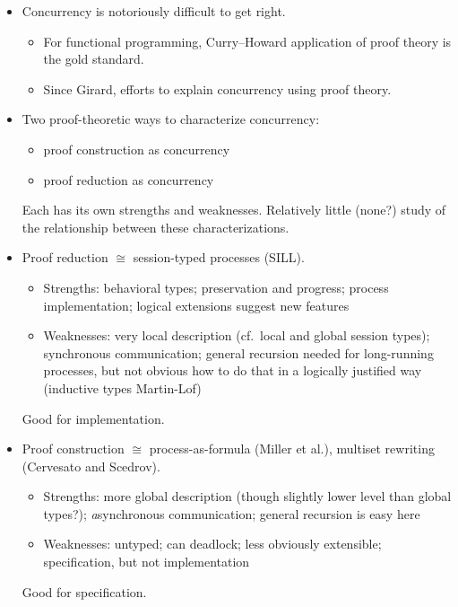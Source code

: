 \begin{itemize}
\item
  Concurrency is notoriously difficult to get right.
  \begin{itemize}[nosep]
  \item For functional programming, Curry--Howard application of proof theory is the gold standard.
  \item Since Girard, efforts to explain concurrency using proof theory.
  \end{itemize}

\item 
  Two proof-theoretic ways to characterize concurrency:
  \begin{itemize}[nosep]
  \item proof construction as concurrency
  \item proof reduction as concurrency
  \end{itemize}
  Each has its own strengths and weaknesses.
  Relatively little (none?) study of the relationship between these characterizations.

\item
  Proof reduction $\cong$ session-typed processes (SILL).
  \begin{itemize}[nosep]
  \item Strengths: behavioral types; preservation and progress; process implementation;
                   logical extensions suggest new features
  \item Weaknesses: very local description (cf.\ local and global session types);
                    synchronous communication; general recursion needed for long-running
                    processes, but not obvious how to do that in a logically justified way
                    (inductive types Martin-Lof)
  \end{itemize}
  Good for implementation.

\item
  Proof construction $\cong$ process-as-formula (Miller et al.),
                             multiset rewriting (Cervesato and Scedrov).
  \begin{itemize}[nosep]
  \item Strengths: more global description (though slightly lower level than global types?);
                   \emph{a}synchronous communication; general recursion is easy here
  \item Weaknesses: untyped; can deadlock; less obviously extensible;
                    specification, but not implementation
  \end{itemize}
  Good for specification.


\end{itemize}
